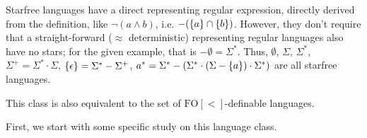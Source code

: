 Starfree languages have a direct representing regular expression, directly derived from the definition, like $\neg(a \wedge b)$, i.e. $-(\Set{a}\cap\Set{b})$. However, they don't require that a straight-forward ($\approx$ deterministic) representing regular languages also have no stars; for the given example, that is $-\emptyset = \Sigma^*$. Thus, $\emptyset$, $\Sigma$, $\Sigma^*$, $\Sigma^+ = \Sigma^* \cdot \Sigma$, $\Set{\epsilon} = \Sigma^* - \Sigma^+$, $a^* = \Sigma^* - (\Sigma^* \cdot (\Sigma - \Set{a}) \cdot \Sigma^*)$ are all starfree languages.

This class is also equivalent to the set of $\mathrm{FO[<]}$-definable languages. %

First, we start with some specific study on this language class.

